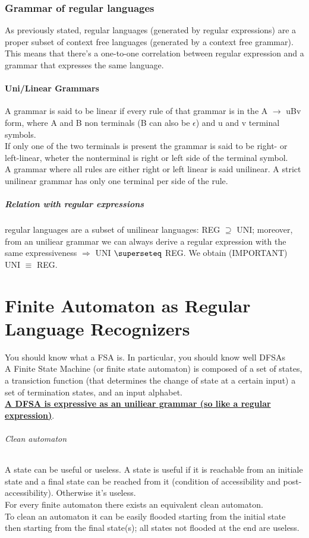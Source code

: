 \documentclass[10pt,a4paper]{article}
\begin{document}
		\section{Grammar of regular languages}
			As previously stated, regular languages (generated by regular expressions) are a proper subset of context free languages (generated by a context free grammar). This means that there's a one-to-one correlation between regular expression and a grammar that expresses the same language. 
			\subsection{Uni/Linear Grammars}
				A grammar is said to be linear if every rule of that grammar is in the A $\rightarrow$ uBv form, where A and B non terminals (B can also be $\epsilon$) and u and v terminal symbols.\\
				If only one of the two terminals is present the grammar is said to be right- or left-linear, wheter the nonterminal is right or left side of the terminal symbol.\\
				A grammar where all rules are either right or left linear is said unilinear. A strict unilinear grammar has only one terminal per side of the rule.\\
				\subsubsection{Relation with regular expressions} regular languages are a subset of unilinear languages: REG $\supseteq$ UNI; moreover, from an uniliear grammar we can always derive a regular expression with the same expressiveness $\Rightarrow$ UNI $\superseteq$ REG. We obtain (IMPORTANT) UNI $\equiv$ REG.
	
	\clearpage	
	\part{Finite Automaton as Regular Language Recognizers}
		You should know what a FSA is. In particular, you should know well DFSAs\\
		A Finite State Machine (or finite state automaton) is composed of a set of states, a transiction function (that determines the change of state at a certain input) a set of termination states, and an input alphabet.\\
		\textbf{\underline{A DFSA is expressive as an uniliear grammar (so like a regular expression)}}.\\
		\paragraph{Clean automaton}
			A state can be useful or useless. A state is useful if it is reachable from an initiale state and a final state can be reached from it (condition of accessibility and post-accessibility). Otherwise it's useless.\\
			For every finite automaton there exists an equivalent clean automaton.\\
			To clean an automaton it can be easily flooded starting from the initial state then starting from the final state(s); all states not flooded at the end are useless.
\end{document}

